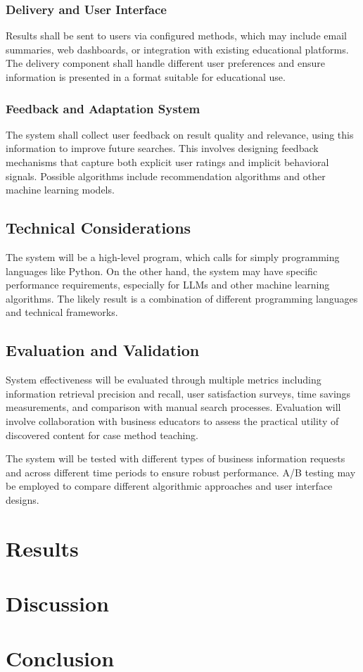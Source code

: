 \documentclass[final-report]{report-template}
\begin{document}
\subsubsection{Delivery and User Interface} Results shall be sent to users via
configured methods, which may include email summaries, web dashboards, or
integration with existing educational platforms. The delivery component shall
handle different user preferences and ensure information is presented in a
format suitable for educational use.

\subsubsection{Feedback and Adaptation System} The system shall collect user
feedback on result quality and relevance, using this information to improve
future searches. This involves designing feedback mechanisms that capture both
explicit user ratings and implicit behavioral signals. Possible algorithms
include recommendation algorithms and other machine learning models.

\subsection{Technical Considerations} 
The system will be a high-level program, which calls for simply programming
languages like Python. On the other hand, the system may have specific
performance requirements, especially for LLMs and other machine learning
algorithms. The likely result is a combination of different programming
languages and technical frameworks.

\subsection{Evaluation and Validation} System effectiveness will be evaluated
through multiple metrics including information retrieval precision and recall,
user satisfaction surveys, time savings measurements, and comparison with
manual search processes. Evaluation will involve collaboration with business
educators to assess the practical utility of discovered content for case method
teaching.

The system will be tested with different types of business information requests
and across different time periods to ensure robust performance. A/B testing may
be employed to compare different algorithmic approaches and user interface
designs.


\section{Results}

\section{Discussion}

\section{Conclusion}

\clearpage


\end{document}
